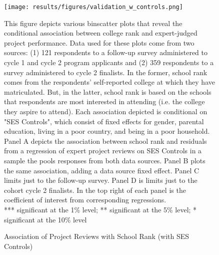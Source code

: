     \newpage
    \begin{figure}[!htb]
    \centering
        \caption{Association of Project Reviews with School Rank (with SES Controls)} \label{fig:proj_robust_2}
    \texttt{[image: results/figures/validation\_w\_controls.png]} 
        \begin{notes}  
        This figure depicts various binscatter plots that reveal the conditional association between college rank and expert-judged project performance. Data used for these plots come from two sources: (1) 121 respondents to a follow-up survey administered to cycle 1 and cycle 2 program applicants and (2) 359 respondents to a survey administered to cycle 2 finalists. In the former, school rank comes from the respondents' self-reported college at which they have matriculated. But, in the latter, school rank is based on the schools that respondents are most interested in attending (i.e. the college they aspire to attend). Each association depicted is conditional on "SES Controls", which consist of fixed effects for gender, parental education, living in a poor country, and being in a poor household. Panel A depicts the association between school rank and residuals from a regression of expert project reviews on SES Controls in a sample the pools responses from both data sources. Panel B plots the same association, adding a data source fixed effect. Panel C limits just to the follow-up survey. Panel D is limits just to the cohort cycle 2 finalists. In the top right of each panel is the coefficient of interest from corresponding regressions. \\
        
       *** significant at the 1\% level; ** significant at the 5\% level; * significant at the 10\% level
        \end{notes}
    \end{figure}
    
